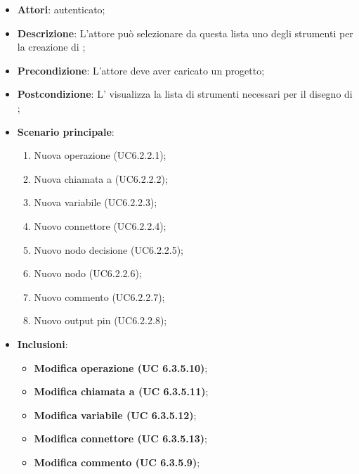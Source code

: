 \begin{itemize}
\item \textbf{Attori}:  autenticato;
\item \textbf{Descrizione}: L'attore può selezionare da questa lista uno degli strumenti per la creazione di ;
\item \textbf{Precondizione}: L'attore deve aver caricato un progetto;
\item \textbf{Postcondizione}: L' visualizza la lista di strumenti necessari per il disegno di ;
\item \textbf{Scenario principale}: \begin{enumerate}\item Nuova operazione (UC6.2.2.1);\item Nuova chiamata a  (UC6.2.2.2);\item Nuova variabile (UC6.2.2.3);\item Nuovo connettore (UC6.2.2.4);\item Nuovo nodo decisione (UC6.2.2.5);\item Nuovo nodo  (UC6.2.2.6);\item Nuovo commento (UC6.2.2.7);\item Nuovo output pin (UC6.2.2.8);
 \end{enumerate}
 \item \textbf{Inclusioni}: \begin{itemize}
 \item \textbf{ Modifica operazione (UC 6.3.5.10)};
 \item \textbf{ Modifica chiamata a  (UC 6.3.5.11)};
 \item \textbf{ Modifica variabile (UC 6.3.5.12)};
  \item \textbf{ Modifica connettore (UC 6.3.5.13)};
  \item \textbf{ Modifica commento (UC 6.3.5.9)};
 \end{itemize}

\end{itemize}
